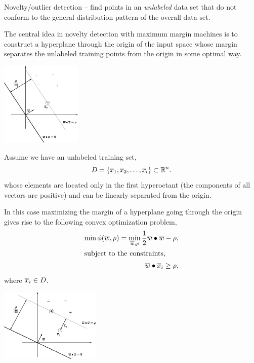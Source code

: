 \documentclass[a4paper,blends,pdf,colorBG,slideColor]{prosper}
\begin{document}
\small
Novelty/outlier detection -- find points in an {\em unlabeled} data set that do not
conform to the general distribution pattern of the overall data set.

The central idea in novelty detection with maximum margin machines is to construct
a hyperplane through the origin of the input space whose margin separates the unlabeled training points  from the origin in some optimal way.
\begin{center}
\includegraphics[height=40mm]{figures/fig13-01.eps}
\end{center}
\es

Assume we have an unlabeled training set,
\begin{equation*}
D = \{ \overline{x}_1, \overline{x}_2,\ldots,\overline{x}_l \} \subset \mathbb{R}^{n}.
\end{equation*}
whose elements are located only in the first hyperoctant (the components of all vectors are positive) and can be linearly separated from the origin.

In this case maximizing the margin of a hyperplane going through the origin
gives rise to the following convex optimization
problem,
\begin{align*}
\min \phi(\overline{w},\rho) = \min_{\overline{w},\rho} \frac{1}{2} \overline{w}\bullet\overline{w} - \rho,\\
\intertext{subject to the constraints,}
 \overline{w}\bullet\overline{x}_i \ge \rho,
\end{align*}
where $\overline{x}_i \in D$.

\es

\small
\begin{center}
\includegraphics[height=35mm]{figures/fig13-02.eps}
\end{center}
\end{document}
